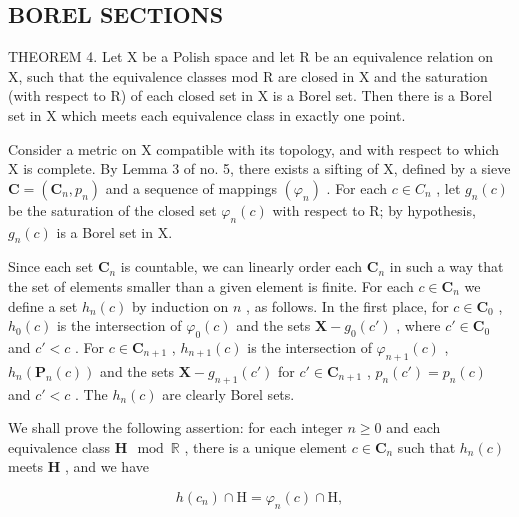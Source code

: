 \subsection{BOREL SECTIONS}

THEOREM 4. Let X be a Polish space and let R be an equivalence relation on X, such that the equivalence classes mod R are closed in X and the saturation (with respect to R) of each closed set in X is a Borel set. Then there is a Borel set in X which meets each equivalence class in exactly one point.

Consider a metric on X compatible with its topology, and with respect to which X is complete. By Lemma 3 of no. 5, there exists a sifting of X, defined by a sieve \(\mathbf{C} = (\mathbf{C}_{n}, p_{n})\) and a sequence of mappings \((\varphi_{n})\) . For each \(c \in C_{n}\) , let \(g_{n}(c)\) be the saturation of the closed set \(\varphi_{n}(c)\) with respect to R; by hypothesis, \(g_{n}(c)\) is a Borel set in X.

Since each set \(\mathbf{C}_n\) is countable, we can linearly order each \(\mathbf{C}_n\) in such a way that the set of elements smaller than a given element is finite. For each \(c \in \mathbf{C}_n\) we define a set \(h_n(c)\) by induction on \(n\) , as follows. In the first place, for \(c \in \mathbf{C}_0\) , \(h_0(c)\) is the intersection of \(\varphi_0(c)\) and the sets \(\mathbf{X} - g_0(c')\) , where \(c' \in \mathbf{C}_0\) and \(c' < c\) . For \(c \in \mathbf{C}_{n+1}\) , \(h_{n+1}(c)\) is the intersection of \(\varphi_{n+1}(c)\) , \(h_n(\mathbf{P}_n(c))\) and the sets \(\mathbf{X} - g_{n+1}(c')\) for \(c' \in \mathbf{C}_{n+1}\) , \(p_n(c') = p_n(c)\) and \(c' < c\) . The \(h_n(c)\) are clearly Borel sets.

We shall prove the following assertion: for each integer \(n \geqslant 0\) and each equivalence class \(\mathbf{H} \mod \mathbb{R}\) , there is a unique element \(c \in \mathbf{C}_n\) such that \(h_n(c)\) meets \(\mathbf{H}\) , and we have

\[
h (c _ {n}) \cap \mathrm{H} = \varphi_ {n} (c) \cap \mathrm{H},
\]

